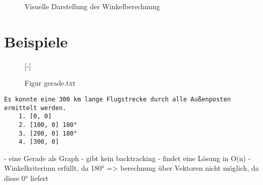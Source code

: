 \documentclass[a4paper,10pt,ngerman]{scrartcl}
\begin{document}
    \begin{figure}[h]
        \centering
        \caption{Visuelle Darstellung der Winkelberechnung}\label{fig:figure2}
    \end{figure}



    \newpage
    \section{Beispiele}\label{sec:beispiele}

\begin{figure}[H]
    [-]
    \FigurFuenf{}
    \caption{Figur gerade.txt}
    \label{fig:Figure1}
\end{figure}

    \begin{lstlisting}[frame=single, title=Programmausgabe gerade.txt, breaklines=true,label={lst:lstlisting2}]
    Es konnte eine 300 km lange Flugstrecke durch alle Außenposten ermittelt werden.
    1. [0, 0]
    2. [100, 0] 180°
    3. [200, 0] 180°
    4. [300, 0]
    \end{lstlisting}

    - eine Gerade als Graph
    - gibt kein backtracking
    - findet eine Lösung in O(n)
    - Winkelkriterium erfüllt, da 180°
    => berechnung über Vektoren nicht möglich, da diese 0° liefert
\end{document}
